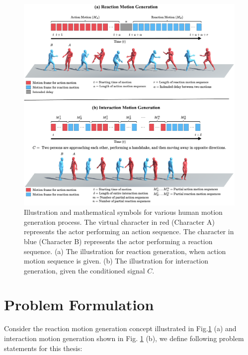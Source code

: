 \begin{figure}[!t]	
	\centering
	\includegraphics[width=1\textwidth]{figures/chapter1/fig_problem_statement}
	\caption{Illustration and mathematical symbols for various human motion generation process. The virtual character in red (Character A) represents the actor performing an action sequence. The character in blue (Character B) represents the actor performing a reaction sequence. (a) The illustration for reaction generation, when action motion sequence is given. (b) The illustration for interaction generation, given the conditioned signal $C$.}
	\label{fig_problem_statement}
\end{figure}




\section{Problem Formulation}
Consider the reaction motion generation concept illustrated in Fig.\ref{fig_problem_statement} (a) and interaction motion generation shown in Fig. \ref{fig_problem_statement} (b), we define following problem statements for this thesis:

